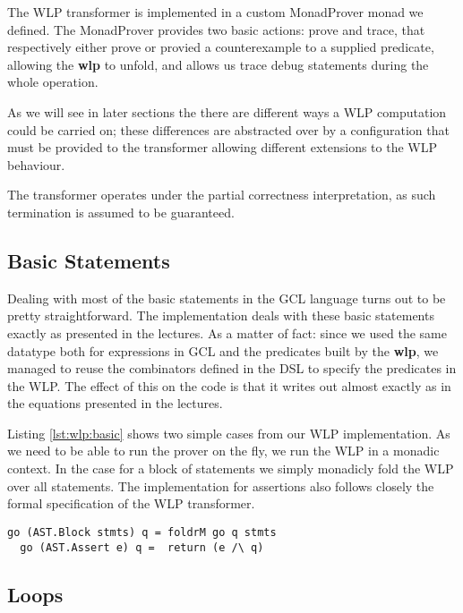 \documentclass[]{scrartcl}
\begin{document}
The WLP transformer is implemented in a custom MonadProver monad we defined.
The MonadProver provides two basic actions: prove and trace, that respectively
either prove or provied a counterexample to a supplied predicate, allowing the
\textbf{wlp} to unfold, and allows us trace debug statements during the whole operation.

As we will see in later sections the there are different ways a WLP computation
could be carried on; these differences are abstracted over by a configuration
that must be provided to the transformer allowing different extensions to the
WLP behaviour.

The transformer operates under the partial correctness interpretation, as such
termination is assumed to be guaranteed.

\subsection{Basic Statements}

Dealing with most of the basic statements in the GCL language turns out to
be pretty straightforward. The implementation deals with these basic statements
exactly as presented in the lectures.
As a matter of fact: since we used the same datatype both for expressions in GCL
and the predicates built by the \textbf{wlp}, we managed to reuse the combinators defined
in the DSL to specify the predicates in the WLP. The effect of this on the code
is that it writes out almost exactly as in the equations presented in the lectures.

Listing \ref{lst:wlp:basic} shows two simple cases from our WLP implementation.
As we need to be able to run the prover on the fly, we run the WLP in a monadic context.
In the case for a block of statements we simply monadicly fold the WLP over all statements.
The implementation for assertions also follows closely the formal specification of the
WLP transformer.

\begin{lstlisting}[caption=WLP implementation example, label=lst:wlp:basic]
  go (AST.Block stmts) q = foldrM go q stmts
  go (AST.Assert e) q =  return (e /\ q)
\end{lstlisting}

\subsection{Loops}
\end{document}
